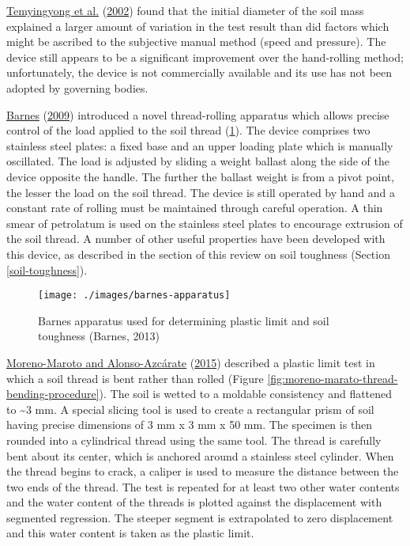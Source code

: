 \documentclass[
  letterpaper,
  openany]{book}
\begin{document}
\protect\hyperlink{ref-Temyingyong2002}{Temyingyong et al.} (\protect\hyperlink{ref-Temyingyong2002}{2002}) found that the initial diameter of the soil mass explained a larger amount of variation in the test result than did factors which might be ascribed to the subjective manual method (speed and pressure).
The device still appears to be a significant improvement over the hand-rolling method; unfortunately, the device is not commercially available and its use has not been adopted by governing bodies.

\protect\hyperlink{ref-Barnes2009}{Barnes} (\protect\hyperlink{ref-Barnes2009}{2009}) introduced a novel thread-rolling apparatus which allows precise control of the load applied to the soil thread (\ref{fig:barnes-apparatus}).
The device comprises two stainless steel plates: a fixed base and an upper loading plate which is manually oscillated.
The load is adjusted by sliding a weight ballast along the side of the device opposite the handle.
The further the ballast weight is from a pivot point, the lesser the load on the soil thread. The device is still operated by hand and a constant rate of rolling must be maintained through careful operation.
A thin smear of petrolatum is used on the stainless steel plates to encourage extrusion of the soil thread.
A number of other useful properties have been developed with this device, as described in the section of this review on soil toughness (Section \ref{soil-toughness}).

\begin{figure}

{\centering \texttt{[image: ./images/barnes-apparatus]} 

}

\caption[Barnes apparatus for determining plastic limit and soil toughness.]{Barnes apparatus used for determining plastic limit and soil toughness (Barnes, 2013)}\label{fig:barnes-apparatus}
\end{figure}

\protect\hyperlink{ref-Moreno-Maroto2015a}{Moreno-Maroto and Alonso-Azcárate} (\protect\hyperlink{ref-Moreno-Maroto2015a}{2015}) described a plastic limit test in which a soil thread is bent rather than rolled (Figure \ref{fig:moreno-marato-thread-bending-procedure}).
The soil is wetted to a moldable consistency and flattened to \textasciitilde3 mm.
A special slicing tool is used to create a rectangular prism of soil having precise dimensions of 3 mm x 3 mm x 50 mm.
The specimen is then rounded into a cylindrical thread using the same tool.
The thread is carefully bent about its center, which is anchored around a stainless steel cylinder. When the thread begins to crack, a caliper is used to measure the distance between the two ends of the thread.
The test is repeated for at least two other water contents and the water content of the threads is plotted against the displacement with segmented regression.
The steeper segment is extrapolated to zero displacement and this water content is taken as the plastic limit.
\end{document}
